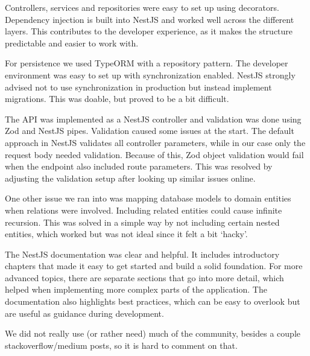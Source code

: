 Controllers, services and repositories were easy to set up using decorators.
Dependency injection is built into NestJS and worked well across the different layers.
This contributes to the developer experience, as it makes the structure predictable and easier to work with.

For persistence we used TypeORM with a repository pattern.
The developer environment was easy to set up with synchronization enabled.
NestJS strongly advised not to use synchronization in production but instead implement migrations.
This was doable, but proved to be a bit difficult.

The API was implemented as a NestJS controller and validation was done using Zod and NestJS pipes.
Validation caused some issues at the start.
The default approach in NestJS validates all controller parameters, while in our case only the request body needed validation.
Because of this, Zod object validation would fail when the endpoint also included route parameters.
This was resolved by adjusting the validation setup after looking up similar issues online.

One other issue we ran into was mapping database models to domain entities when relations were involved.
Including related entities could cause infinite recursion.
This was solved in a simple way by not including certain nested entities, which worked but was not ideal since it felt a bit `hacky'.

The NestJS documentation was clear and helpful.
It includes introductory chapters that made it easy to get started and build a solid foundation.
For more advanced topics, there are separate sections that go into more detail, which helped when implementing more complex parts of the application.
The documentation also highlights best practices, which can be easy to overlook but are useful as guidance during development.

We did not really use (or rather need) much of the community, besides a couple stackoverflow/medium posts, so it is hard to comment on that.
